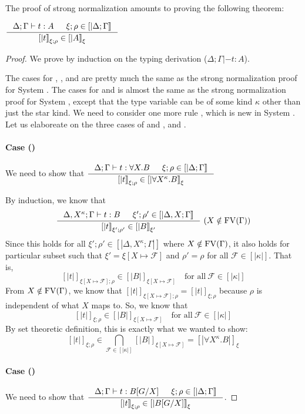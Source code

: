 The proof of strong normalization amounts to proving the following theorem:
\begin{theorem}
$ \inference{\Delta;\Gamma|- t:A & \xi;\rho \in [|\Delta;\Gamma|]}
	    {[|t|]_{\xi;\rho} \in [|A|]_\xi} $
\end{theorem}
\begin{proof}
We prove by induction on the typing derivation ($\Delta;\Gamma |- t:A$).

The cases for , , and  are pretty
much the same as the strong normalization proof for System \F.
The cases for  and  is almost the same
as the strong normalization proof for System \F, except that the type variable
can be of some kind $\kappa$ other than just the star kind.
We need to consider one more rule , which is new in System \Fw.
Let us elaboreate on the three cases of
 and , and .

\paragraph{Case ()}
We need to show that
$ \inference{\Delta;\Gamma |- t : \forall X.B & \xi;\rho\in[|\Delta;\Gamma|]}
	{[|t|]_{\xi;\rho} \in [|\forall X^\kappa.B|]_\xi} $

By induction, we know that
\[ \inference{\Delta,X^\kappa;\Gamma |- t:B & \xi';\rho'\in[|\Delta,X;\Gamma|]}
	{[|t|]_{\xi';\rho'} \in [|B|]_{\xi'}} ~
	(X\notin\FV(\Gamma))
\]
Since this holds for all $\xi';\rho' \in [|\Delta,X^\kappa;\Gamma|]$ where
$X\notin\mathop{\mathrm{FV}}(\Gamma)$, it also holds for particular subset such that
$\xi' = \xi[X\mapsto\mathcal{F}]$ and $\rho'=\rho$ for all $\mathcal{F}\in[|\kappa|]$.
That is,
\[ [|t|]_{\xi[X\mapsto\mathcal{F}];\rho} \in [|B|]_{\xi[X\mapsto\mathcal{F}]}
	\quad \text{for all}~\mathcal{F}\in[|\kappa|] \]
From $X\notin\mathop{\mathrm{FV}}(\Gamma)$, we know that
$[|t|]_{\xi[X\mapsto\mathcal{F}];\rho} = [|t|]_{\xi;\rho}$
because $\rho$ is independent of what $X$ maps to.
So, we know that
\[ [|t|]_{\xi;\rho} \in [|B|]_{\xi[X\mapsto\mathcal{F}]}
	\quad \text{for all}~\mathcal{F}\in[|\kappa|] \]
By set theoretic definition, this is exactly what we wanted to show:
\[ [|t|]_{\xi;\rho} \in
	\bigcap_{\mathcal{F}\in[|\kappa|]} [|B|]_{\xi[X\mapsto\mathcal{F}]}
	= [|\forall X^\kappa.B|]_\xi
\]

\paragraph{Case ()}
We need to show that
$ \inference{\Delta;\Gamma |- t : B[G/X] & \xi;\rho\in[|\Delta;\Gamma|]}
	{[|t|]_{\xi;\rho} \in [|B[G/X]|]_\xi} $.


\end{proof}

